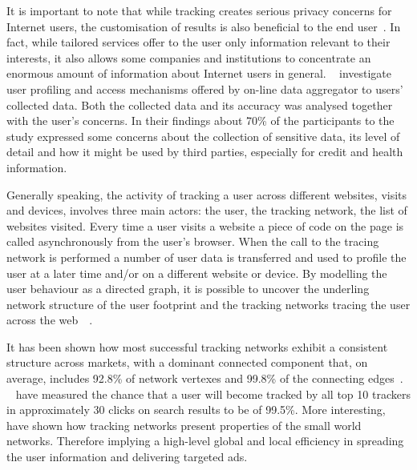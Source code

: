 It is important to note that while tracking creates serious privacy concerns for Internet users, the customisation of results is also beneficial to the end user~\cite{castelluccia2012behavioural}. In fact, while tailored services offer to the user only information relevant to their interests, it also allows some companies and institutions to concentrate an enormous amount of information about Internet users in general. ~\cite{rao2015they} investigate user profiling and access mechanisms offered by on-line data aggregator to users' collected data. Both the collected data and its accuracy was analysed together with the user's concerns. In their findings about 70\% of the participants to the study expressed some concerns about the collection of sensitive data, its level of detail and how it might be used by third parties, especially for credit and health information.

Generally speaking, the activity of tracking a user across different websites, visits and devices, involves three main actors: the user, the tracking network, the list of websites visited. Every time a user visits a website a piece of code on the page is called asynchronously from the user's browser. When the call to the tracing network is performed a number of user data is transferred and used to profile the user at a later time and/or on a different website or device.  By modelling the user behaviour as a directed graph, it is possible to uncover the underling network structure of the user footprint and the tracking networks tracing the user across the web~\cite{kalavri2016like}~\cite{schelter2016tracking}.

It has been shown how most successful tracking networks exhibit a consistent structure across markets, with a dominant connected component that, on average, includes 92.8\% of network vertexes and 99.8\% of the connecting edges~\cite{gomer2013network}. ~\cite{gomer2013network} have measured the chance that a user will become tracked by all top 10 trackers in approximately 30 clicks on search results to be of 99.5\%. More interesting, ~\cite{gomer2013network} have shown how tracking networks present properties of the small world networks. Therefore implying a high-level global and local efficiency in spreading the user information and delivering targeted ads.

